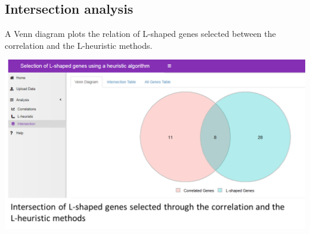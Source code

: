 \subsection{Intersection analysis}

A Venn diagram plots the relation of L-shaped genes selected between the correlation and the L-heuristic methods.

\begin{center}
	\includegraphics[width=0.8\columnwidth]{./images/intersection_method.png}
\end{center}
